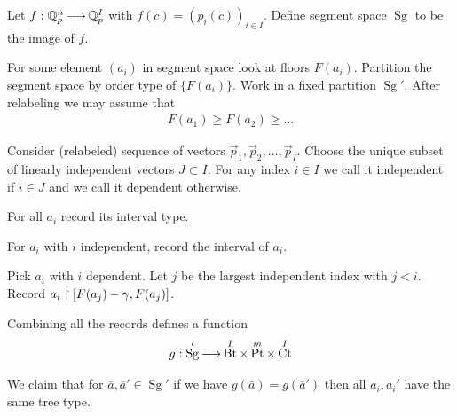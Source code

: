 \documentclass{amsart}
\DeclareMathOperator{\Sg}{Sg}
\DeclareMathOperator{\Bt}{Bt}
\DeclareMathOperator{\Pt}{Pt}
\DeclareMathOperator{\Ct}{Ct}
\begin{document}
Let $f: \mathbb{Q}_p^n \operatorname{\longrightarrow} \mathbb{Q}_p^I$ with $f(\bar c) = (p_i(\bar c))_{i \in I}$.
Define segment space $\Sg$ to be the image of $f$.

For some element $(a_i)$ in segment space look at floors $F(a_i)$.
Partition the segment space by order type of $\{F(a_i)\}$.
Work in a fixed partition $\Sg'$.
After relabeling we may assume that
\begin{align*}
	F(a_1) \geq F(a_2) \geq \ldots 
\end{align*}

Consider (relabeled) sequence of vectors $\vec p_1, \vec p_2, \ldots, \vec p_I$.
Choose the unique subset of linearly independent vectors $J \subset I$.
For any index $i \in I$ we call it independent if $i \in J$ and we call it dependent otherwise.

For all $a_i$ record its interval type.

For $a_i$ with $i$ independent, record the interval of $a_i$.

Pick $a_i$ with $i$ dependent.
Let $j$ be the largest independent index with $j < i$.
Record $a_i \upharpoonright [F(a_j) - \gamma, F(a_j)]$.

Combining all the records defines a function
\begin{align*}
	g: \Sg' \arr \Bt^I \times \Pt^m \times \Ct^I
\end{align*}

We claim that for $\bar a, \bar a' \in \Sg'$ if we have $g(\bar a) = g(\bar a')$ then all $a_i, a_i'$ have the same tree type.
\end{document}
